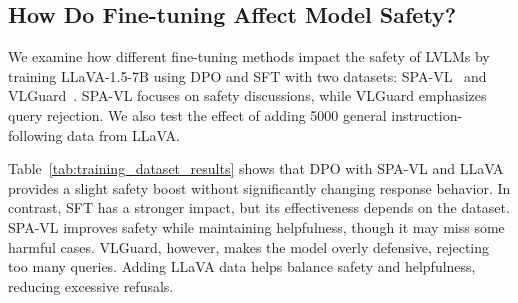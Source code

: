 \subsection{How Do Fine-tuning Affect Model Safety?}
We examine how different fine-tuning methods impact the safety of LVLMs by training LLaVA-1.5-7B using DPO and SFT with two datasets: SPA-VL~\cite{zhang2024spa} and VLGuard~\cite{zong2024safety}. SPA-VL focuses on safety discussions, while VLGuard emphasizes query rejection. We also test the effect of adding 5000 general instruction-following data from LLaVA.  

Table~\ref{tab:training_dataset_results} shows that DPO with SPA-VL and LLaVA provides a slight safety boost without significantly changing response behavior. In contrast, SFT has a stronger impact, but its effectiveness depends on the dataset. SPA-VL improves safety while maintaining helpfulness, though it may miss some harmful cases. VLGuard, however, makes the model overly defensive, rejecting too many queries. Adding LLaVA data helps balance safety and helpfulness, reducing excessive refusals.  


\begin{table}[ht]
    \centering
    \caption{Comparison of varying fine-tuning settings.} %
    \label{tab:training_dataset_results}
\end{table}
